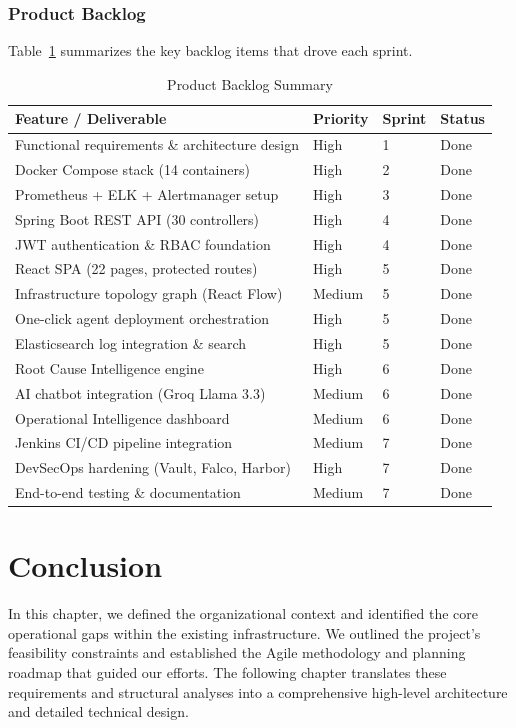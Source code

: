 \documentclass[12pt,a4paper]{report}
\begin{document}
\subsubsection{Product Backlog}

Table~\ref{tab:product_backlog} summarizes the key backlog items that drove each sprint.

\begin{table}[H]
\centering
\renewcommand{\arraystretch}{1.3}
\begin{tabular}{|p{5cm}|l|l|l|}
\hline
\textbf{Feature / Deliverable} & \textbf{Priority} & \textbf{Sprint} & \textbf{Status} \\
\hline
Functional requirements \& architecture design & High & 1 & Done \\
\hline
Docker Compose stack (14 containers) & High & 2 & Done \\
\hline
Prometheus + ELK + Alertmanager setup & High & 3 & Done \\
\hline
Spring Boot REST API (30 controllers) & High & 4 & Done \\
\hline
JWT authentication \& RBAC foundation & High & 4 & Done \\
\hline
React SPA (22 pages, protected routes) & High & 5 & Done \\
\hline
Infrastructure topology graph (React Flow) & Medium & 5 & Done \\
\hline
One-click agent deployment orchestration & High & 5 & Done \\
\hline
Elasticsearch log integration \& search & High & 5 & Done \\
\hline
Root Cause Intelligence engine & High & 6 & Done \\
\hline
AI chatbot integration (Groq Llama 3.3) & Medium & 6 & Done \\
\hline
Operational Intelligence dashboard & Medium & 6 & Done \\
\hline
Jenkins CI/CD pipeline integration & Medium & 7 & Done \\
\hline
DevSecOps hardening (Vault, Falco, Harbor) & High & 7 & Done \\
\hline
End-to-end testing \& documentation & Medium & 7 & Done \\
\hline
\end{tabular}
\caption{Product Backlog Summary}
\label{tab:product_backlog}
\end{table}

\section*{Conclusion}
In this chapter, we defined the organizational context and identified the core operational gaps within the existing infrastructure. We outlined the project's feasibility constraints and established the Agile methodology and planning roadmap that guided our efforts. The following chapter translates these requirements and structural analyses into a comprehensive high-level architecture and detailed technical design.
\end{document}
